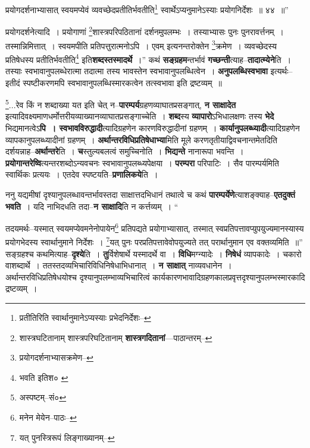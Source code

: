 \documentclass[article,12pt,a4paper]{memoir}
\begin{document}
	प्रयोगदर्शनाभ्यासात् स्वयमप्येवं व्यवच्छेदप्रतीतिर्भवतीति\footnote{प्रतीतिरिति स्वार्थानुमानेऽप्यस्याः प्रभेदनिर्देशः--\cite{dp-msC}} स्वार्थेऽप्यनुमानेऽस्याः प्रयोगनिर्देशः ॥ ४४ ॥” 
	  
	प्रयोगदर्शनेत्यादि । प्रयोगाणां \footnote{शास्त्रघटितानाम् \cite{dp-msA} \cite{dp-edP} \cite{dp-edH} \cite{dp-edE} \cite{dp-edN} शास्त्रपरिघटितानाम् \cite{dp-msB} \textbf{शास्त्रगदितानां}—पाठान्तरम्--\cite{dp-msD-n}}\-शास्त्रपरिपठितानां दर्शनमुपलम्भः । तस्याभ्यासः पुनः पुनरावर्त्तनम् । तस्मान्निमित्तात् । स्वयमपीति प्रतिपत्तुरात्मनोऽपि । एवम् इत्यनन्तरोक्तेन \footnote{प्रयोगदर्शनाभ्यासक्रमेण--\cite{dp-msD-n}}\-क्रमेण । व्यवच्छेदस्य प्रतिषेधस्य प्रतीतिर्भवतीति\footnote{भवति इतिश० \cite{dp-msC} \cite{dp-msB}} इति\textbf{शब्दस्तस्मादर्थे} ।” कथं \textbf{सङ्ग्रहम}न्तर्भावं \textbf{गच्छन्ती}त्याह--\textbf{तादात्म्येने}ति । तस्याः स्वभावानुपलब्धेरात्मा तदात्मा तस्य भावस्तेन स्वभावानुपलब्धित्वेन । \textbf{अनुपलब्धिस्वभावा} इत्यर्थः--इतीदं स्पष्टीकरणमपि स्वभावानुपलब्धिस्मारकत्वेन तत्स्वभावा इति द्रष्टव्यम् ॥
	\pend
      

	  \pstart \footnote{अस्पष्टम्--सं०}\-...रेव किं न शब्दाख्या यत इति चेत् न--\textbf{पारम्पर्य}ग्रहणव्याघातप्रसङ्गात्, \textbf{न साक्षादेत} इत्यादिवक्ष्यमाणधर्मोत्तरीयव्याख्यानव्याघातप्रसङ्गाच्चेति । \textbf{शब्द}स्य \textbf{व्यापारो}ऽभिधालक्षणः तस्य \textbf{भेदे} भिद्यमानत्वेऽ\textbf{पि । स्वभावविरुद्धादी}त्यादिग्रहणेन कारणविरुद्धादीनां ग्रहणम् । \textbf{कार्यानुपलब्ध्यादी}त्यादिग्रहणेन व्यापकानुपलब्ध्यादीनां ग्रहणम् । \textbf{अर्थान्तरविधिप्रतिषेधाभ्या}मिति मूले करणतृतीयाद्विवचनान्तमेतदिति दर्शयन्नाह--\textbf{अर्थान्तरे}ति । \textbf{च}स्तुल्यबलत्वं समुच्चिनोति । \textbf{भिद्यन्ते} नानारूपा भवन्ति । \textbf{प्रयोगान्तरेष्वि}त्यन्तरशब्दोऽन्यवचनः स्वभावानुपलब्ध्यपेक्षया । \textbf{परम्परा} परिपाटिः । सैव पारम्पर्यमिति स्वार्थिकः प्रत्ययः । एतदेव स्पष्टयति--\textbf{प्रणालिकये}ति ।
	\pend
      

	  \pstart ननु यद्यमीषां दृश्यानुपलब्धावन्तर्भावस्तदा साक्षात्तदभिधानं तथात्वे च कथं \textbf{पारम्पर्येणे}त्याशङ्क्याह--\textbf{एतदुक्तं भवति} । यदि नाभिदधति तदा--\textbf{न साक्षादि}ति न कर्त्तव्यम् ।  \leavevmode{} “
	  
	तदयमर्थः--यस्मात् स्वयमप्येवमनेनोपायेन\footnote{मनेन मेयेन--पाठः--\cite{dp-msD-n}} प्रतिपद्यते प्रयोगाभ्यासात्, तस्मात् स्वप्रतिपत्तावप्युपयुज्यमानस्यास्य प्रयोगभेदस्य स्वार्थानुमाने निर्देशः । \footnote{यत् पुनस्त्रिरूपं लिङ्गाख्यानम्--\cite{dp-msD-n}}\-यत् पुनः परप्रतिपत्तावेवोपयुज्यते तत् परार्थानुमान एव वक्तव्यमिति ॥” सङ्ग्रहश्च कथमित्याह--\textbf{दृश्ये}ति । \textbf{तु}र्विशेषार्थे यस्मादर्थे वा । \textbf{विधि}मग्न्यादेः । \textbf{निषेधं} व्यापकादेः । चकारो वाशब्दार्थे । ततस्तदव्यभिचारिविधिनिषेधाभिधानात् । \textbf{न साक्षात्} नाव्यवधानेन । अर्थान्तरविधिप्रतिषेधयोश्च दृश्यानुपलम्भाव्यभिचारित्वं कार्यकारणभावादिग्रहणकालप्रवृत्तदृश्यानुपलम्भस्मारकादि द्रष्टव्यम् ।
	\pend
      
\end{document}
